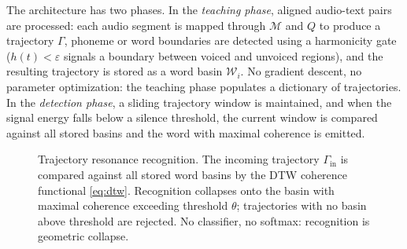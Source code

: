 \documentclass[12pt, a4paper]{article}
\begin{document}
The architecture has two phases. In the \emph{teaching phase}, aligned audio-text pairs are processed: each audio segment is mapped through $\mathcal{M}$ and $Q$ to produce a trajectory $\Gamma$, phoneme or word boundaries are detected using a harmonicity gate ($h(t) < \varepsilon$ signals a boundary between voiced and unvoiced regions), and the resulting trajectory is stored as a word basin $\mathcal{W}_i$. No gradient descent, no parameter optimization: the teaching phase populates a dictionary of trajectories. In the \emph{detection phase}, a sliding trajectory window is maintained, and when the signal energy falls below a silence threshold, the current window is compared against all stored basins and the word with maximal coherence is emitted.

\begin{figure}[p]
\centering
{}
\caption{Trajectory resonance recognition. The incoming trajectory $\Gamma_{\mathrm{in}}$ is compared against all stored word basins by the DTW coherence functional \eqref{eq:dtw}. Recognition collapses onto the basin with maximal coherence exceeding threshold $\theta$; trajectories with no basin above threshold are rejected. No classifier, no softmax: recognition is geometric collapse.}
\label{fig:recognition}
\end{figure}
\end{document}
